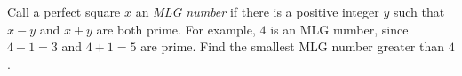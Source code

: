 Call a perfect square $x$ an \emph{MLG number} if there is a positive integer $y$ such that $x-y$ and $x+y$ are both prime. For example, $4$ is an MLG number, since $4-1=3$ and $4+1=5$ are prime. Find the smallest MLG number greater than $4$.

